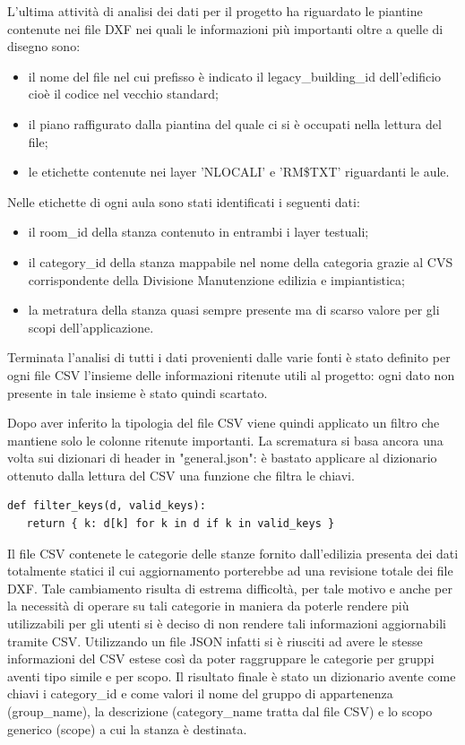 \documentclass[12pt]{report}
\begin{document}
L'ultima attività di analisi dei dati per il progetto ha riguardato le piantine contenute nei file DXF nei quali le informazioni più importanti oltre a quelle di disegno sono:
\begin{itemize}
\item il nome del file nel cui prefisso è indicato il legacy\_building\_id dell'edificio cioè il codice nel vecchio standard;
\item il piano raffigurato dalla piantina del quale ci si è occupati nella lettura del file;
\item le etichette contenute nei layer 'NLOCALI' e 'RM\$TXT' riguardanti le aule.
\end{itemize}  

Nelle etichette di ogni aula sono stati identificati i seguenti dati:
\begin{itemize}
\item il room\_id della stanza contenuto in entrambi i layer testuali;
\item il category\_id della stanza mappabile nel nome della categoria grazie al CVS corrispondente della Divisione Manutenzione edilizia e impiantistica;
\item la metratura della stanza quasi sempre presente ma di scarso valore per gli scopi dell'applicazione.
\end{itemize}  

Terminata l'analisi di tutti i dati provenienti dalle varie fonti è stato definito per ogni file CSV l'insieme delle informazioni ritenute utili al progetto: ogni dato non presente in tale insieme è stato quindi scartato.

Dopo aver inferito la tipologia del file CSV viene quindi applicato un filtro che mantiene solo le colonne ritenute importanti. 
La scrematura si basa ancora una volta sui dizionari di header in "general.json": è bastato applicare al dizionario ottenuto dalla lettura del CSV una funzione che filtra le chiavi.
\begin{lstlisting}[label=codice,caption=Definizione della funzione filter\_keys, frame=single]
def filter_keys(d, valid_keys):
   return { k: d[k] for k in d if k in valid_keys }
\end{lstlisting}

Il file CSV contenete le categorie delle stanze fornito dall'edilizia presenta dei dati totalmente statici il cui aggiornamento porterebbe ad una revisione totale dei file DXF.
Tale cambiamento risulta di estrema difficoltà, per tale motivo e anche per la necessità di operare su tali categorie in maniera da poterle rendere più utilizzabili per gli utenti si è deciso di non rendere tali informazioni aggiornabili tramite CSV.
Utilizzando un file JSON infatti si è riusciti ad avere le stesse informazioni del CSV estese così da poter raggruppare le categorie per gruppi aventi tipo simile e per scopo. 
Il risultato finale è stato un dizionario avente come chiavi i category\_id e come valori il nome del gruppo di appartenenza (group\_name), la descrizione (category\_name tratta dal file CSV) e lo scopo generico (scope) a cui la stanza è destinata.
\end{document}
